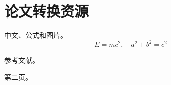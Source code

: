 \documentclass[fontset=fandol]{ctexart}
\begin{document}
\section{论文转换资源}
中文、公式和图片。\[E=mc^2,\quad a^2+b^2=c^2\]
参考文献\cite{example}。

\newpage 第二页。
\end{document}
